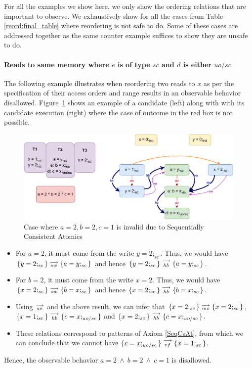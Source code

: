 

    For all the examples we show here, we only show the ordering relations that are important to observe. 
    We exhaustively show for all the cases from Table \ref{reord:final_table} where reordering is not safe to do. 
    Some of these cases are addressed together as the same counter example suffices to show they are unsafe to do.

    \paragraph{Reads to same memory where $e$ is of type $sc$ and $d$ is either $uo/sc$}

        The following example illustrates when reordering two reads to $x$ as per the specification of their access orders and range results in an observable behavior disallowed.
        Figure~\ref{reord_counter:example1(a)} shows an example of a candidate (left) along with with its candidate execution (right) where the case of outcome in the red box is not possible. 
        \begin{figure}[H]
            \centering
            \includegraphics[scale=0.7]{7.CounterExamples/ReorderingCandidate/Example0(Rsc-Ruo,sc).pdf}
            \caption{Case where $a = 2, b = 2, c = 1$ is invalid due to Sequentially Consistent Atomics}
            \label{reord_counter:example1(a)}
        \end{figure}
        
        \begin{itemize}
            \item For $a=2$, it must come from the write $y=2;_{sc}$. 
            Thus, we would have $\{y=2;_{sc}\}\stackrel{\longrightarrow}{_{sw}}\{a=y;_{sc}\}$ and hence $\{y=2;_{sc}\}\stackrel{\longrightarrow}{_{hb}}\{a=y;_{sc}\}$.
            \item For $b=2$, it must come from the write $x=2$. 
            Thus, we would have $\{x=2;_{sc}\}\stackrel{\longrightarrow}{_{sw}}\{b=x;_{sc}\}$ and hence $\{x=2;_{sc}\}\stackrel{\longrightarrow}{_{hb}}\{b=x;_{sc}\}$.
            \item Using $\stackrel{\longrightarrow}{_{ao}}$ and the above result, we can infer that $\{x=2;_{sc}\}\stackrel{\longrightarrow}{_{mo}}\{x=2;_{sc}\}$, $\{x=1;_{sc}\}\stackrel{\longrightarrow}{_{hb}}\{c=x;_{uo/sc}\}$ and $\{x=2;_{sc}\}\stackrel{\longrightarrow}{_{hb}}\{c=x;_{uo/sc}\}$.
            \item These relations correspond to patterns of Axiom \ref{SeqCsAt}, from which we can conclude that we cannot have $\{c=x;_{uo/sc}\}\stackrel{\longrightarrow}{_{rf}}\{x=1;_{sc}\}$.         
        \end{itemize}
        Hence, the observable behavior $a=2 \ \wedge \ b=2 \ \wedge \ c=1$ is disallowed.

